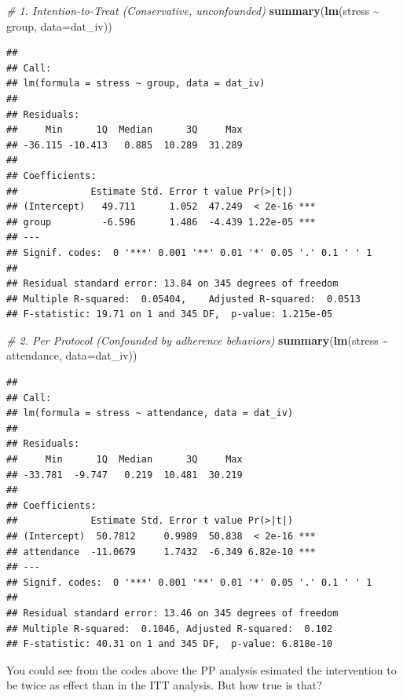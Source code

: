 \documentclass[
]{book}
\newenvironment{Shaded}{\begin{snugshade}}{\end{snugshade}}
\newcommand{\AttributeTok}[1]{\textcolor[rgb]{0.13,0.29,0.53}{#1}}
\newcommand{\CommentTok}[1]{\textcolor[rgb]{0.56,0.35,0.01}{\textit{#1}}}
\newcommand{\FunctionTok}[1]{\textcolor[rgb]{0.13,0.29,0.53}{\textbf{#1}}}
\newcommand{\NormalTok}[1]{#1}
\newcommand{\SpecialCharTok}[1]{\textcolor[rgb]{0.81,0.36,0.00}{\textbf{#1}}}
\begin{document}
\begin{Shaded}
\begin{Highlighting}[]
\CommentTok{\# 1. Intention{-}to{-}Treat (Conservative, unconfounded)}
\FunctionTok{summary}\NormalTok{(}\FunctionTok{lm}\NormalTok{(stress }\SpecialCharTok{\textasciitilde{}}\NormalTok{ group, }\AttributeTok{data=}\NormalTok{dat\_iv))}
\end{Highlighting}
\end{Shaded}

\begin{verbatim}
## 
## Call:
## lm(formula = stress ~ group, data = dat_iv)
## 
## Residuals:
##     Min      1Q  Median      3Q     Max 
## -36.115 -10.413   0.885  10.289  31.289 
## 
## Coefficients:
##             Estimate Std. Error t value Pr(>|t|)    
## (Intercept)   49.711      1.052  47.249  < 2e-16 ***
## group         -6.596      1.486  -4.439 1.22e-05 ***
## ---
## Signif. codes:  0 '***' 0.001 '**' 0.01 '*' 0.05 '.' 0.1 ' ' 1
## 
## Residual standard error: 13.84 on 345 degrees of freedom
## Multiple R-squared:  0.05404,    Adjusted R-squared:  0.0513 
## F-statistic: 19.71 on 1 and 345 DF,  p-value: 1.215e-05
\end{verbatim}

\begin{Shaded}
\begin{Highlighting}[]
\CommentTok{\# 2. Per Protocol (Confounded by adherence behaviors)}
\FunctionTok{summary}\NormalTok{(}\FunctionTok{lm}\NormalTok{(stress }\SpecialCharTok{\textasciitilde{}}\NormalTok{ attendance, }\AttributeTok{data=}\NormalTok{dat\_iv))}
\end{Highlighting}
\end{Shaded}

\begin{verbatim}
## 
## Call:
## lm(formula = stress ~ attendance, data = dat_iv)
## 
## Residuals:
##     Min      1Q  Median      3Q     Max 
## -33.781  -9.747   0.219  10.481  30.219 
## 
## Coefficients:
##             Estimate Std. Error t value Pr(>|t|)    
## (Intercept)  50.7812     0.9989  50.838  < 2e-16 ***
## attendance  -11.0679     1.7432  -6.349 6.82e-10 ***
## ---
## Signif. codes:  0 '***' 0.001 '**' 0.01 '*' 0.05 '.' 0.1 ' ' 1
## 
## Residual standard error: 13.46 on 345 degrees of freedom
## Multiple R-squared:  0.1046, Adjusted R-squared:  0.102 
## F-statistic: 40.31 on 1 and 345 DF,  p-value: 6.818e-10
\end{verbatim}

You could see from the codes above the PP analysis esimated the intervention to be twice as effect than in the ITT analysis. But how true is that?
\end{document}
